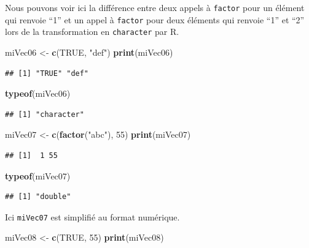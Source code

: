 \documentclass[
]{book}
\newenvironment{Shaded}{\begin{snugshade}}{\end{snugshade}}
\newcommand{\DecValTok}[1]{\textcolor[rgb]{0.00,0.00,0.81}{#1}}
\newcommand{\KeywordTok}[1]{\textcolor[rgb]{0.13,0.29,0.53}{\textbf{#1}}}
\newcommand{\NormalTok}[1]{#1}
\newcommand{\OtherTok}[1]{\textcolor[rgb]{0.56,0.35,0.01}{#1}}
\newcommand{\StringTok}[1]{\textcolor[rgb]{0.31,0.60,0.02}{#1}}
\begin{document}
Nous pouvons voir ici la différence entre deux appels à \texttt{factor} pour un élément qui renvoie ``1'' et un appel à \texttt{factor} pour deux éléments qui renvoie ``1'' et ``2'' lors de la transformation en \texttt{character} par R.

\begin{Shaded}
\begin{Highlighting}[]
\NormalTok{miVec06 <-}\StringTok{ }\KeywordTok{c}\NormalTok{(}\OtherTok{TRUE}\NormalTok{, }\StringTok{"def"}\NormalTok{)}
\KeywordTok{print}\NormalTok{(miVec06)}
\end{Highlighting}
\end{Shaded}

\begin{verbatim}
## [1] "TRUE" "def"
\end{verbatim}

\begin{Shaded}
\begin{Highlighting}[]
\KeywordTok{typeof}\NormalTok{(miVec06)}
\end{Highlighting}
\end{Shaded}

\begin{verbatim}
## [1] "character"
\end{verbatim}

\begin{Shaded}
\begin{Highlighting}[]
\NormalTok{miVec07 <-}\StringTok{ }\KeywordTok{c}\NormalTok{(}\KeywordTok{factor}\NormalTok{(}\StringTok{"abc"}\NormalTok{), }\DecValTok{55}\NormalTok{)}
\KeywordTok{print}\NormalTok{(miVec07)}
\end{Highlighting}
\end{Shaded}

\begin{verbatim}
## [1]  1 55
\end{verbatim}

\begin{Shaded}
\begin{Highlighting}[]
\KeywordTok{typeof}\NormalTok{(miVec07)}
\end{Highlighting}
\end{Shaded}

\begin{verbatim}
## [1] "double"
\end{verbatim}

Ici \texttt{miVec07} est simplifié au format numérique.

\begin{Shaded}
\begin{Highlighting}[]
\NormalTok{miVec08 <-}\StringTok{ }\KeywordTok{c}\NormalTok{(}\OtherTok{TRUE}\NormalTok{, }\DecValTok{55}\NormalTok{)}
\KeywordTok{print}\NormalTok{(miVec08)}
\end{Highlighting}
\end{Shaded}
\end{document}
